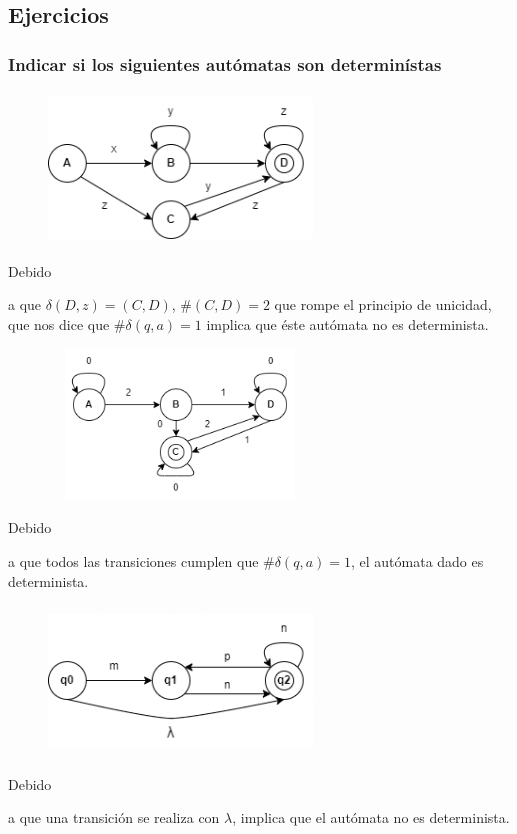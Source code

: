 \documentclass[stu, 12pt, letterpaper, donotrepeattitle, floatsintext, natbib]{apa7}
\begin{document}
\subsection{Ejercicios}
\subsubsection{Indicar si los siguientes autómatas son determinístas}
\begin{figure}[H]
    \centering
    \includegraphics[width=7cm, height=4cm]{automata1_ej1.png}
\end{figure}
Debido \begin{justifying}
    a que \(\delta(D,z)=(C, D)\), \(\#(C, D)=2\) que rompe el principio de unicidad, que
    nos dice que \(\#\delta(q,a)=1\) implica que éste autómata no es determinista.\par
\end{justifying}
\begin{figure}[H]
    \centering
    \includegraphics[width=7cm, height=4cm]{automata2_ej1.png}
\end{figure}
Debido \begin{justifying}
    a que todos las transiciones cumplen que \(\#\delta(q,a)=1\), el autómata dado es determinista.\par
\end{justifying}
\begin{figure}[H]
    \centering
    \includegraphics[width=7cm, height=4cm]{automata3_ej1.png}
\end{figure}
Debido \begin{justifying}
    a que una transición se realiza con \(\lambda\), implica que el autómata no es determinista.\par
\end{justifying}
\vspace{\baselineskip}
\end{document}
